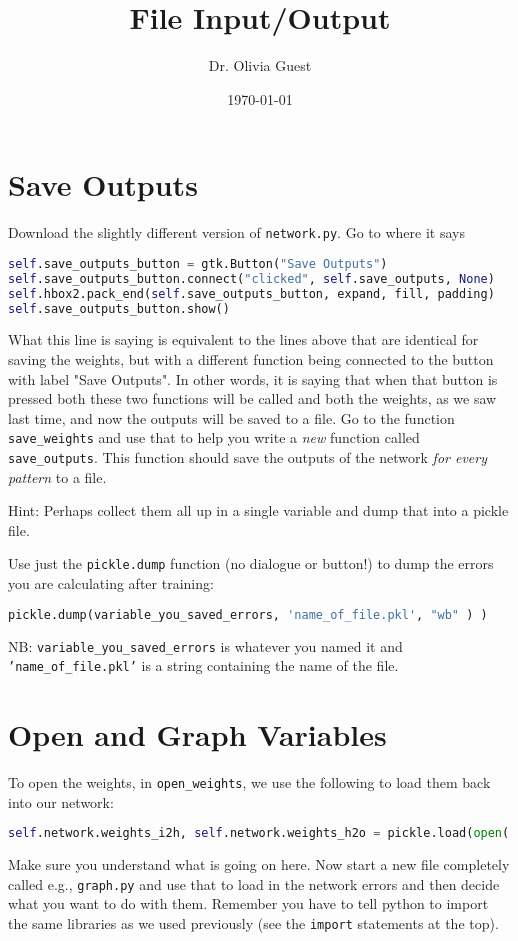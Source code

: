 \documentclass[a4paper,10pt]{article}
\title{File Input/Output}
\author{Dr. Olivia Guest}
\date{\today}
\begin{document}
\maketitle

\section{Save Outputs}
Download the slightly different version of \texttt{network.py}. Go to where it says
\begin{lstlisting}[language=Python]
self.save_outputs_button = gtk.Button("Save Outputs")
self.save_outputs_button.connect("clicked", self.save_outputs, None)
self.hbox2.pack_end(self.save_outputs_button, expand, fill, padding)
self.save_outputs_button.show()
\end{lstlisting}

What this line is saying is equivalent to the lines above that are identical for saving the weights, but with a different function being connected to the button with label "Save Outputs". In other words, it is saying that when that button is pressed both these two functions will be called and both the weights, as we saw last time, and now the outputs will be saved to a file. Go to the function \texttt{save\_weights} and use that to help you write a \emph{new} function called \texttt{save\_outputs}. This function should save the outputs of the network \emph{for every pattern} to a file.

Hint: Perhaps collect them all up in a single variable and dump that into a pickle file.

Use just the \texttt{pickle.dump} function (no dialogue or button!) to dump the errors you are calculating after training:
\begin{lstlisting}[language=Python]
pickle.dump(variable_you_saved_errors, 'name_of_file.pkl', "wb" ) )
\end{lstlisting}
NB: \texttt{variable\_you\_saved\_errors} is whatever you named it and \texttt{'name\_of\_file.pkl'} is a string containing the name of the file.

\section{Open and Graph Variables}
To open the weights, in \texttt{open\_weights}, we use the following to load them back into our network:
\begin{lstlisting}[language=Python]
self.network.weights_i2h, self.network.weights_h2o = pickle.load(open( dialog.get_filename(), "rb" ) )
\end{lstlisting}
Make sure you understand what is going on here. Now start a new file completely called e.g., \texttt{graph.py} and use that to load in the network errors and then decide what you want to do with them. Remember you have to tell python to import the same libraries as we used previously (see the \texttt{import} statements at the top). 
\end{document}
